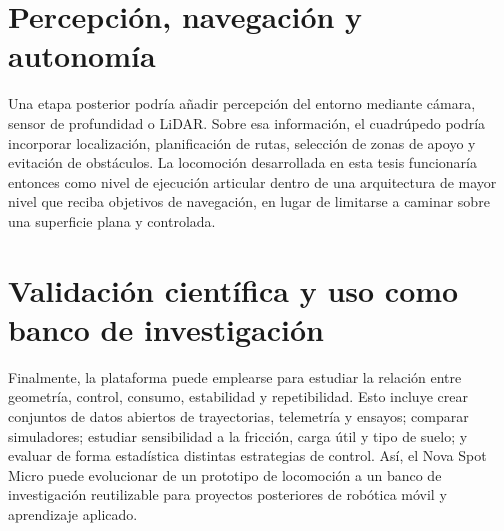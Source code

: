 \section{Percepción, navegación y autonomía}

Una etapa posterior podría añadir percepción del entorno mediante cámara,
sensor de profundidad o LiDAR. Sobre esa información, el cuadrúpedo podría
incorporar localización, planificación de rutas, selección de zonas de apoyo y
evitación de obstáculos. La locomoción desarrollada en esta tesis funcionaría
entonces como nivel de ejecución articular dentro de una arquitectura de mayor
nivel que reciba objetivos de navegación, en lugar de limitarse a caminar sobre
una superficie plana y controlada.

\section{Validación científica y uso como banco de investigación}

Finalmente, la plataforma puede emplearse para estudiar la relación entre
geometría, control, consumo, estabilidad y repetibilidad. Esto incluye crear
conjuntos de datos abiertos de trayectorias, telemetría y ensayos; comparar
simuladores; estudiar sensibilidad a la fricción, carga útil y tipo de suelo;
y evaluar de forma estadística distintas estrategias de control. Así, el Nova
Spot Micro puede evolucionar de un prototipo de locomoción a un banco de
investigación reutilizable para proyectos posteriores de robótica móvil y
aprendizaje aplicado.

